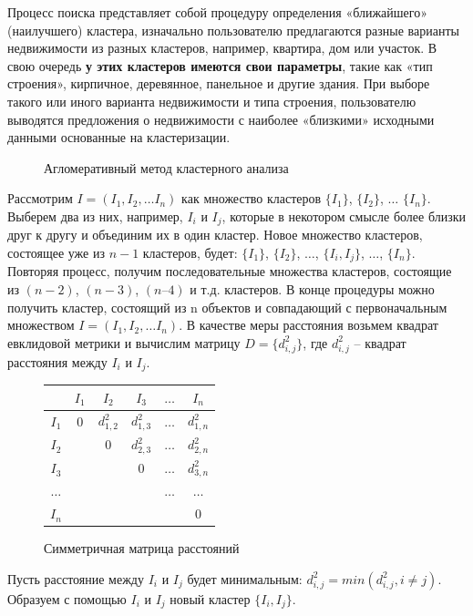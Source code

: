 \documentclass[a4paper,14pt,openany,final]{extreport} %
\def\oldcaption{} \let\oldcaption=\caption
\def\caption{\stepcounter{captionsnum}\oldcaption}
\begin{document}
Процесс поиска представляет собой процедуру определения «ближайшего» (наилучшего) кластера, изначально пользователю предлагаются разные варианты недвижимости из разных кластеров, например, квартира, дом или участок. В свою очередь\textbf{ у этих кластеров имеются свои параметры}, такие как «тип строения», кирпичное, деревянное, панельное и другие здания. При выборе такого или иного варианта недвижимости и типа строения, пользователю выводятся предложения о недвижимости с наиболее «близкими» исходными данными основанные на кластеризации.

\begin{figure}[htbp]
  \centering

  \caption{Агломеративный метод кластерного анализа}
  \label{fig:clusagloshow}
\end{figure}

Рассмотрим $Ι = (Ι_1, Ι_2, \ldots Ι_n)$ как множество кластеров $\{Ι_1\}$, $\{Ι_2\}$, $\ldots$ $\{Ι_n\}$. Выберем два из них, например, $Ι_i$ и $Ι_j$, которые в некотором смысле более близки друг к другу и объединим их в один кластер. Новое множество кластеров, состоящее уже из $n-1$ кластеров, будет: $\{Ι_1\}$, $\{Ι_2\}$, $\ldots$, $\{Ι_i , Ι_j\}$, $\ldots$, $\{Ι_n\}$. Повторяя процесс, получим последовательные множества кластеров, состоящие из $(n-2)$, $(n-3)$, $(n–4)$ и т.д. кластеров. В конце процедуры можно получить кластер, состоящий из n объектов и совпадающий с первоначальным множеством $Ι = (Ι_1, Ι_2, \ldots Ι_n)$. В качестве меры расстояния возьмем квадрат евклидовой метрики и вычислим матрицу $D= \{d_{i,j}^2 \}$, где $d_{i,j}^2$ -- квадрат расстояния между $Ι_i$ и $Ι_j$.

\begin{figure}[htbp]
  \centering
  \begin{tabular}{|c||c|c|c|c|c|}
    \hline
          & $I_1$ & $I_2$       & $I_3$       & $\ldots$ & $I_n$        \\
    \hline
    \hline
    $I_1$ & 0     & $d_{1,2}^2$ & $d_{1,3}^2$ & $\ldots$ & $d_{1,n}^2$  \\
    \hline
    $I_2$ &       & 0           & $d_{2,3}^2$ & $\ldots$ & $d_{2,n}^2$  \\
    \hline
    $I_3$ &       &             & 0           & $\ldots$ & $d_{3,n}^2$  \\
    \hline
 $\ldots$ &       &             &             & $\ldots$ & $\ldots$ \\
    \hline
    $I_n$ &       &             &             &          & 0  \\
    \hline
  \end{tabular}
  \caption{Симметричная матрица расстояний}
  \label{fig:disssimm}
\end{figure}
Пусть расстояние между $Ι_i$ и $Ι_j$ будет минимальным: $d_{i,j}^2=min⁡(d_{i,j}^2,i\neq j)$. Образуем с помощью $Ι_i$ и $Ι_j$ новый кластер $\{Ι_i, Ι_j\}.$
\end{document}
